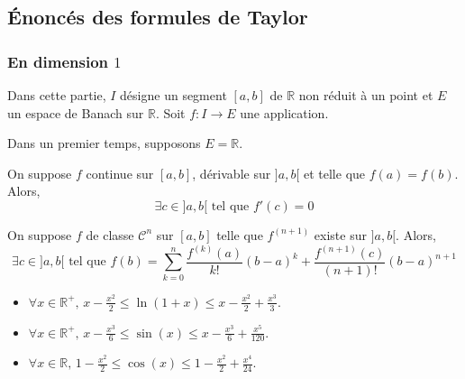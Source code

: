 




  \subsection{Énoncés des formules de Taylor}

  \subsubsection{En dimension \texorpdfstring{$1$}{1}}


  Dans cette partie, $I$ désigne un segment $[a,b]$ de $\mathbb{R}$ non réduit à un point et $E$ un espace de Banach sur $\mathbb{R}$. Soit $f : I \rightarrow E$ une application.

  Dans un premier temps, supposons $E = \mathbb{R}$.

  \begin{theorem}
    \label{218-1}
    On suppose $f$ continue sur $[a,b]$, dérivable sur $]a,b[$ et telle que $f(a) = f(b)$. Alors,
    \[ \exists c \in ]a,b[ \text{ tel que } f'(c) = 0 \]
  \end{theorem}

  \begin{theorem}
    On suppose $f$ de classe $\mathcal{C}^n$ sur $[a,b]$ telle que $f^{(n+1)}$ existe sur $]a,b[$. Alors,
    \[ \exists c \in ]a,b[ \text{ tel que } f(b) = \sum_{k=0}^{n} \frac{f^{(k)} (a)}{k!} (b-a)^k + \frac{f^{(n+1)}(c)}{(n+1)!} (b-a)^{n+1} \]
  \end{theorem}

  \begin{application}
    \begin{itemize}
      \item $\forall x \in \mathbb{R}^+, \, x - \frac{x^2}{2} \leq \ln(1+x) \leq x - \frac{x^2}{2} + \frac{x^3}{3}$.
      \item $\forall x \in \mathbb{R}^+, \, x - \frac{x^3}{6} \leq \sin(x) \leq x - \frac{x^3}{6} + \frac{x^5}{120}$.
      \item $\forall x \in \mathbb{R}, \, 1 - \frac{x^2}{2} \leq \cos(x) \leq 1 - \frac{x^2}{2} + \frac{x^4}{24}$.
    \end{itemize}
  \end{application}

